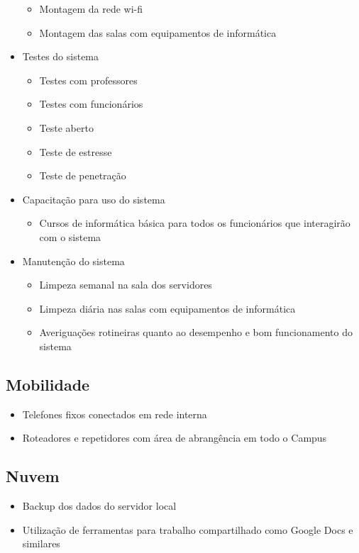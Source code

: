 \begin{itemize}
\begin{itemize}
                    \item Montagem da rede wi-fi
                    \item Montagem das salas com equipamentos de informática
                \end{itemize}
                \item Testes do sistema
                \begin{itemize}
                    \item Testes com professores
                    \item Testes com funcionários
                    \item Teste aberto
                    \item Teste de estresse
                    \item Teste de penetração
                \end{itemize}
                \item Capacitação para uso do sistema
                \begin{itemize}
                    \item Cursos de informática básica para todos os funcionários que interagirão com o sistema
                \end{itemize}
                \item Manutenção do sistema
                \begin{itemize}
                    \item Limpeza semanal na sala dos servidores
                    \item Limpeza diária nas salas com equipamentos de informática
                    \item Averiguações rotineiras quanto ao desempenho e bom funcionamento do sistema
                \end{itemize}
            \end{itemize}
    
        \subsection{Mobilidade}
            \begin{itemize}
                \item Telefones fixos conectados em rede interna
                \item Roteadores e repetidores com área de abrangência em todo o Campus
            \end{itemize}
    
        \subsection{Nuvem}
            \begin{itemize}
                \item Backup dos dados do servidor local
                \item Utilização de ferramentas para trabalho compartilhado como Google Docs e similares
            \end{itemize}
